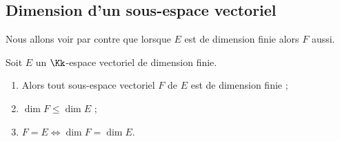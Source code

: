 \documentclass[class=report,crop=false]{standalone}
\begin{document}
\subsection{Dimension d'un sous-espace vectoriel}


Nous allons voir par contre que lorsque $E$ est de dimension finie alors $F$ aussi.
\begin{theoreme}
\label{th:dimsev}
Soit $E$ un $\Kk$-espace vectoriel de dimension finie.
\begin{enumerate}
  \item Alors tout sous-espace vectoriel $F$ de $E$ est de dimension finie ;

  \item $\dim F \le \dim E$ ;

  \item $F=E \iff \dim F = \dim E$.
\end{enumerate}
\end{theoreme}
\end{document}
